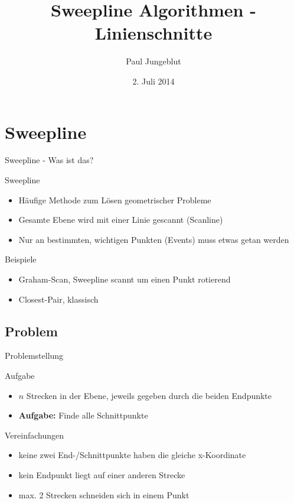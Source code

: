 \documentclass{beamer}
\title{Sweepline Algorithmen - Linienschnitte}
\author{Paul Jungeblut}
\date{2. Juli 2014}
\begin{document}

\begin{frame}
\titlepage
\end{frame}

\section{Sweepline}
\begin{frame}{Sweepline - Was ist das?}
	\begin{block}{Sweepline} 
		\begin{itemize}
			\item Häufige Methode zum Lösen geometrischer Probleme
			\item Gesamte Ebene wird mit einer Linie gescannt (Scanline)
			\item Nur an bestimmten, wichtigen Punkten (Events) muss etwas getan werden
		\end{itemize}
	\end{block}
	\begin{exampleblock}{Beispiele}
		\begin{itemize}
			\item Graham-Scan, Sweepline scannt um einen Punkt rotierend
			\item Closest-Pair, klassisch
		\end{itemize}
	\end{exampleblock}
\end{frame}

\subsection{Problem}
\begin{frame}{Problemstellung}
	\begin{block}{Aufgabe}
		\begin{itemize}
			\item $n$ Strecken in der Ebene, jeweils gegeben durch die beiden Endpunkte
			\item \textbf{Aufgabe:} Finde alle Schnittpunkte
		\end{itemize}
	\end{block}
	
	\begin{block}{Vereinfachungen}
		\begin{itemize}
			\item keine zwei End-/Schnittpunkte haben die gleiche x-Koordinate
			\item kein Endpunkt liegt auf einer anderen Strecke
			\item max. 2 Strecken schneiden sich in einem Punkt
		\end{itemize}
	\end{block}
\end{frame}
\end{document}
